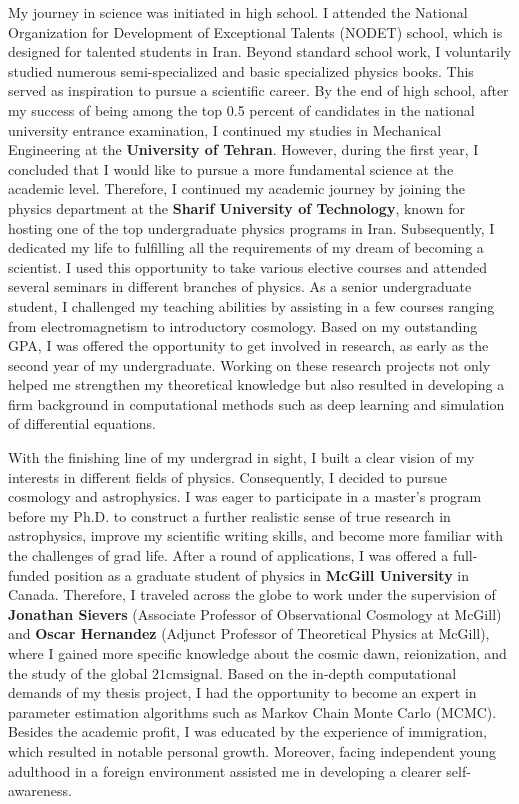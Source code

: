 \documentclass{article}
\begin{document}
My journey in science was initiated in high school. I attended the National Organization for Development of Exceptional Talents (NODET) school, which is designed for talented students in Iran. Beyond standard school work, I voluntarily studied numerous semi-specialized and basic specialized physics books. This served as inspiration to pursue a scientific career.
By the end of high school, after my success of being among the top 0.5 percent of candidates in the national university entrance examination, I continued my studies in Mechanical Engineering at the \textbf{University of Tehran}. However, during the first year, I concluded that I would like to pursue a more fundamental science at the academic level. Therefore, I continued my academic journey by joining the physics department at the \textbf{Sharif University of Technology}, known for hosting one of the top undergraduate physics programs in Iran. Subsequently, I dedicated my life to fulfilling all the requirements of my dream of becoming a scientist. I used this opportunity to take various elective courses and attended several seminars in different branches of physics. As a senior undergraduate student, I challenged my teaching abilities by assisting in a few courses ranging from electromagnetism to introductory cosmology. Based on my outstanding GPA, I was offered the opportunity to get involved in research, as early as the second year of my undergraduate. Working on these research projects not only helped me strengthen my theoretical knowledge but also resulted in developing a firm background in computational methods such as deep learning and simulation of differential equations.\par
With the finishing line of my undergrad in sight, I built a clear vision of my interests in different fields of physics. Consequently, I decided to pursue cosmology and astrophysics. I was eager to participate in a master's program before my Ph.D. to construct a further realistic sense of true research in astrophysics, improve my scientific writing skills, and become more familiar with the challenges of grad life.
After a round of applications, I was offered a full-funded position as a graduate student of physics in \textbf{McGill University} in Canada. Therefore, I traveled across the globe to work under the supervision of \textbf{Jonathan Sievers} (Associate Professor of Observational Cosmology at McGill) and \textbf{Oscar Hernandez} (Adjunct Professor of Theoretical Physics at McGill), where I gained more specific knowledge about the cosmic dawn, reionization, and the study of the global $\mathrm{21cm signal}$. Based on the in-depth computational demands of my thesis project, I had the opportunity to become an expert in parameter estimation algorithms such as Markov Chain Monte Carlo (MCMC). Besides the academic profit, I was educated by the experience of immigration, which resulted in notable personal growth. Moreover, facing independent young adulthood in a foreign environment assisted me in developing a clearer self-awareness.\par
\end{document}
